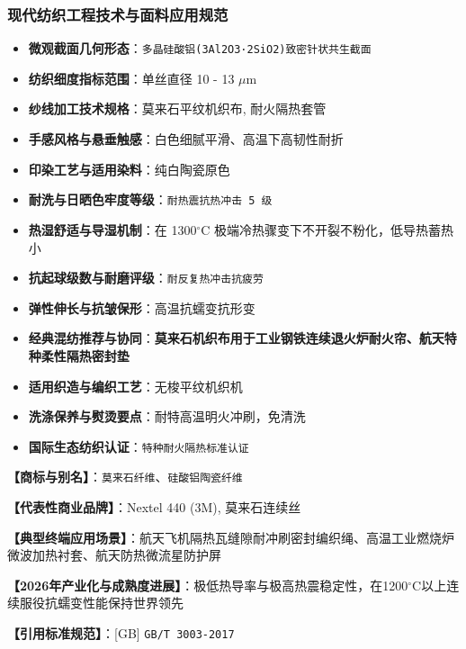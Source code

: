 \documentclass[11pt,openright,twoside,UTF8]{ctexbook}
\begin{document}
\subsubsection*{现代纺织工程技术与面料应用规范}
\begin{itemize} \setlength{\itemsep}{2pt}
    \item \textbf{微观截面几何形态}：\texttt{多晶硅酸铝(3Al2O3·2SiO2)致密针状共生截面}
    \item \textbf{纺织细度指标范围}：单丝直径 10 - 13 $\mu$m
    \item \textbf{纱线加工技术规格}：莫来石平纹机织布, 耐火隔热套管
    \item \textbf{手感风格与悬垂触感}：白色细腻平滑、高温下高韧性耐折
    \item \textbf{印染工艺与适用染料}：纯白陶瓷原色
    \item \textbf{耐洗与日晒色牢度等级}：\texttt{耐热震抗热冲击 5 级}
    \item \textbf{热湿舒适与导湿机制}：在 1300$^\circ\mathrm{C}$ 极端冷热骤变下不开裂不粉化，低导热蓄热小
    \item \textbf{抗起球级数与耐磨评级}：\texttt{耐反复热冲击抗疲劳}
    \item \textbf{弹性伸长与抗皱保形}：高温抗蠕变抗形变
    \item \textbf{经典混纺推荐与协同}：\textbf{莫来石机织布用于工业钢铁连续退火炉耐火帘、航天特种柔性隔热密封垫}
    \item \textbf{适用织造与编织工艺}：无梭平纹机织机
    \item \textbf{洗涤保养与熨烫要点}：耐特高温明火冲刷，免清洗
    \item \textbf{国际生态纺织认证}：\texttt{特种耐火隔热标准认证}
\end{itemize}
\vspace{0.2cm}

\noindent\textbf{【商标与别名】}：\texttt{莫来石纤维}、\texttt{硅酸铝陶瓷纤维}\par
\noindent\textbf{【代表性商业品牌】}：Nextel 440 (3M), 莫来石连续丝\par
\noindent\textbf{【典型终端应用场景】}：航天飞机隔热瓦缝隙耐冲刷密封编织绳、高温工业燃烧炉微波加热衬套、航天防热微流星防护屏\par
\noindent\textbf{【2026年产业化与成熟度进展】}：极低热导率与极高热震稳定性，在1200$^\circ\mathrm{C}$以上连续服役抗蠕变性能保持世界领先\par
\noindent\textbf{【引用标准规范】}：[GB] \texttt{GB/T 3003-2017}\par
\vspace{0.5cm}
\end{document}
